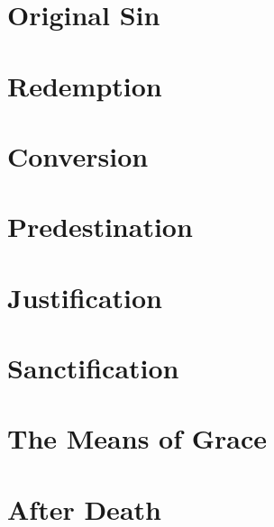 \documentclass[
]{book}
\begin{document}
\hypertarget{original-sin}{%
\section{Original Sin}\label{original-sin}}

\hypertarget{redemption}{%
\section{Redemption}\label{redemption}}

\hypertarget{conversion}{%
\section{Conversion}\label{conversion}}

\hypertarget{predestination}{%
\section{Predestination}\label{predestination}}

\hypertarget{justification}{%
\section{Justification}\label{justification}}

\hypertarget{sanctification}{%
\section{Sanctification}\label{sanctification}}

\hypertarget{the-means-of-grace}{%
\section{The Means of Grace}\label{the-means-of-grace}}

\hypertarget{after-death}{%
\section{After Death}\label{after-death}}
\end{document}
